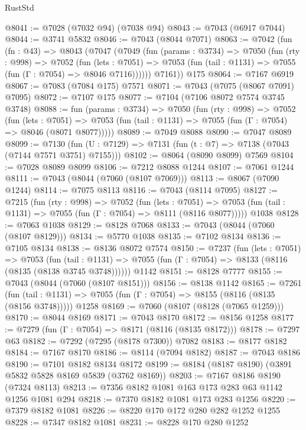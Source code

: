 \begin{lexlean}{RustStd}
\begin{coremodule}
@8041 := @7028 (@7032 @94) (@7038 @94)
@8043 := @7043 (@6917 @7044)
@8044 := @3741 @5832
@8046 := @7043 (@8044 @7071)
@8063 := @7042
    (fun (fn : @43) =>
    @8043
      (@7047
        (@7049
          (fun (params : @3734) =>
          @7050
            (fun (rty : @998) =>
            @7052
              (fun (lets : @7051) =>
              @7053 (fun (tail : @1131) => @7055 (fun (Γ : @7054) => @8046 @7116))))))
        @7161))
    @175
@8064 := @7167 @6919
@8067 := @7083 (@7084 @175) @7571
@8071 := @7043 (@7075 (@8067 @7091) @7095)
@8072 := @7107 @175
@8077 := @7104 (@7106 @8072 @7574 @3745 @3748)
@8088 := fun (params : @3734) =>
  @7050
    (fun (rty : @998) =>
    @7052
      (fun (lets : @7051) =>
      @7053 (fun (tail : @1131) => @7055 (fun (Γ : @7054) => @8046 (@8071 @8077)))))
@8089 := @7049 @8088
@8090 := @7047 @8089
@8099 := @7130 (fun (U : @7129) => @7131 (fun (t : @7) => @7138 (@7043 (@7144 @7571 @3751) @7155)))
@8102 := @8064 (@8090 @8099) @7569
@8104 := @7028 @8089 @8099
@8106 := @7212 @8088 @1244
@8107 := @7061 @1244
@8111 := @7043 (@8044 (@7060 (@8107 @7069)))
@8113 := @8067 (@7090 @1244)
@8114 := @7075 @8113
@8116 := @7043 (@8114 @7095)
@8127 := @7215
    (fun (rty : @998) =>
    @7052
      (fun (lets : @7051) =>
      @7053 (fun (tail : @1131) => @7055 (fun (Γ : @7054) => @8111 (@8116 @8077)))))
    @1038
@8128 := @7063 @1038
@8129 := @8128 @7068
@8133 := @7043 (@8044 (@7060 (@8107 @8129)))
@8134 := @5770 @1038
@8135 := @7102 @8134
@8136 := @7105 @8134
@8138 := @8136 @8072 @7574
@8150 := @7237
    (fun (lets : @7051) =>
    @7053
      (fun (tail : @1131) => @7055 (fun (Γ : @7054) => @8133 (@8116 (@8135 (@8138 @3745 @3748))))))
    @1142
@8151 := @8128 @7777
@8155 := @7043 (@8044 (@7060 (@8107 @8151)))
@8156 := @8138 @1142
@8165 := @7261
    (fun (tail : @1131) => @7055 (fun (Γ : @7054) => @8155 (@8116 (@8135 (@8156 @3748)))))
    @1258
@8169 := @7060 (@8107 (@8128 (@7065 @1259)))
@8170 := @8044 @8169
@8171 := @7043 @8170
@8172 := @8156 @1258
@8177 := @7279 (fun (Γ : @7054) => @8171 (@8116 (@8135 @8172)))
@8178 := @7297 @63
@8182 := @7292 (@7295 (@8178 @7300)) @7082
@8183 := @8177 @8182
@8184 := @7167 @8170
@8186 := @8114 (@7094 @8182)
@8187 := @7043 @8186
@8190 := @7101 @8182 @8134 @8172
@8199 := @8184 (@8187 @8190) (@3891 @5832 @5828 @8169 @5839 (@3762 @8169))
@8203 := @7167 @8186 @8190 (@7324 @8113)
@8213 := @7356 @8182 @1081 @163 @173 @283 @63 @1142 @1256 @1081 @294
@8218 := @7370 @8182 @1081 @173 @283 @1256
@8220 := @7379 @8182 @1081
@8226 := @8220 @170 @172 @280 @282 @1252 @1255
@8228 := @7347 @8182 @1081
@8231 := @8228 @170 @280 @1252

\end{coremodule}
\end{lexlean}
